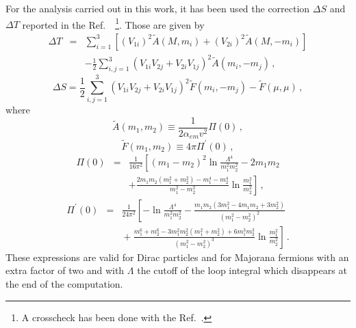 For the analysis carried out in this work, it has been used the correction $\Delta S$ and $\Delta T$  reported in the Ref.~\cite{D'Eramo:2007ga}~\footnote{ A crosscheck has been done with the Ref.~\cite{Abe:2014gua}.}. 
Those are given by
%
\begin{eqnarray}
\Delta T & = & \sum_{i=1}^{3}\left[
\left(V_{1i}\right)^{2}\widetilde{A}\left(M,m_{i}\right)+
\left(V_{2i}\right)^{2}\widetilde{A}\left(M,-m_{i}\right)\right]
\nonumber\\ & & -\frac{1}{2}\sum_{i,j=1}^{3}
\left(V_{1i}V_{2j}+V_{2i}V_{1j}\right)^{2}\widetilde{A}\left(m_{i},-m_{j}\right) \,,
\end{eqnarray}
%
\begin{equation}
\Delta S =   \frac{1}{2}\sum_{i,j=1}^{3}
\left(V_{1i}V_{2j}+V_{2i}V_{1j}\right)^{2}\widetilde{F}\left(m_{i},-m_{j}\right)-\widetilde{F}\left(\mu,\mu\right) \,,
\end{equation}
where
\begin{equation}
\widetilde{A}\left(m_{1},m_{2}\right)\equiv
\frac{1}{2\alpha_{em}v^{2}}\Pi\left(0\right) \,,
\end{equation}
%
\begin{equation}
\widetilde{F}\left(m_{1},m_{2}\right)\equiv 4\pi
\Pi^{'}\left(0\right) \,,
\end{equation}
%
\begin{eqnarray}
\Pi(0) & = & \frac{1}{16\pi^{2}}\left[
\left(m_{1}-m_{2}\right)^{2}\ln\frac{\Lambda^{4}}{m_{1}^{2}m_{2}^{2}}-2m_{1}m_{2}\right.
\nonumber\\ & &
+\left.\frac{2m_{1}m_{2}\left(m_{1}^{2}+m_{2}^{2}\right)-m_{1}^{4}-m_{2}^{4}}{m_{1}^{2}-m_{2}^{2}}
\ln\frac{m_{1}^{2}}{m_{2}^{2}}\right] \,,
\end{eqnarray}
%
\begin{eqnarray}
\Pi^{'}(0) & = & \frac{1}{24\pi^{2}}\left[
-\ln\frac{\Lambda^{4}}{m_{1}^{2}m_{2}^{2}}-
\frac{m_{1}m_{2}\left(3m_{1}^{2}-4m_{1}m_{2}+3m_{2}^{2}\right)}{\left(m_{1}^{2}-m_{2}^{2}\right)^{2}}\right.
{}\nonumber\\ & &
{}+\left.\frac{m_{1}^{6}+m_{2}^{6}-3m_{1}^{2}m_{2}^{2}\left(m_{1}^{2}+m_{2}^{2}\right)+6m_{1}^{3}m_{2}^{3}}
{\left(m_{1}^{2}-m_{2}^{2}\right)^{3}}\ln\frac{m_{1}^{2}}{m_{2}^{2}}\right] \,.
\end{eqnarray}
%
These expressions are valid for Dirac particles and for Majorana fermions with an extra factor of two and with $\Lambda$ the cutoff of the loop integral which
disappears at the end of the computation.

